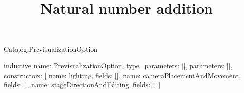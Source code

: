 \begin{lexlean}{Catalog.PrevisualizationOption}
\title{Natural number addition}
\begin{semanticmodule}
inductive{
  name: PrevisualizationOption,
  type_parameters: [],
  parameters: [],
  constructors: [
    {name: lighting, fields: []},
    {name: cameraPlacementAndMovement, fields: []},
    {name: stageDirectionAndEditing, fields: []}
  ]
}
\end{semanticmodule}
\end{lexlean}
